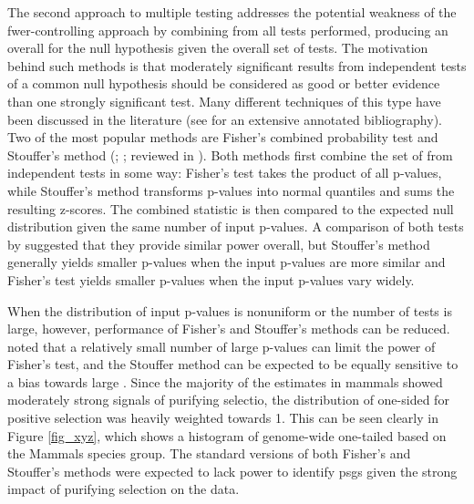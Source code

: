 The second approach to multiple testing addresses the potential
weakness of the \ac{fwer}-controlling approach by combining \pvs from
all \sw tests performed, producing an overall \pv for the null
hypothesis given the overall set of tests. The motivation behind such
methods is that moderately significant results from independent tests
of a common null hypothesis should be considered as good or better
evidence than one strongly significant test. Many different techniques
of this type have been discussed in the literature (see
\citet{Cousins2007} for an extensive annotated bibliography). Two of
the most popular methods are Fisher's combined probability test and
Stouffer's method (\citealp{Fisher1932}; \citealp{Stouffer1949};
reviewed in \citealp{Whitlock2005}). Both methods first combine the
set of \pvs from independent tests in some way: Fisher's test takes
the product of all p-values, while Stouffer's method transforms
p-values into normal quantiles and sums the resulting z-scores. The
combined statistic is then compared to the expected null distribution
given the same number of input p-values. A comparison of both tests by
\citet{Darlington2000} suggested that they provide similar power
overall, but Stouffer's method generally yields smaller p-values when
the input p-values are more similar and Fisher's test yields smaller
p-values when the input p-values vary widely.

When the distribution of input p-values is nonuniform or the number of
tests is large, however, performance of Fisher's and Stouffer's
methods can be reduced. \citet{Zaykin2002} noted that a relatively
small number of large p-values can limit the power of Fisher's test,
and the Stouffer method can be expected to be equally sensitive to a
bias towards large \pvs. Since the majority of the \sw estimates in
mammals showed moderately strong signals of purifying selectio, the
distribution of one-sided \pvs for positive selection was heavily
weighted towards 1. This can be seen clearly in Figure \ref{fig_xyz},
which shows a histogram of genome-wide one-tailed \pvs based on the
Mammals species group. The standard versions of both Fisher's and
Stouffer's methods were expected to lack power to identify \acp{psg}
given the strong impact of purifying selection on the \sw data.

